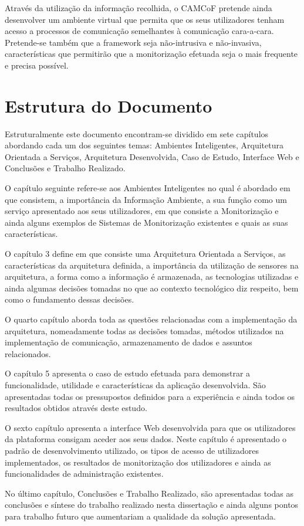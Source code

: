 Através da utilização da informação recolhida, o CAMCoF pretende ainda desenvolver um ambiente virtual que permita que os seus utilizadores tenham acesso a processos de comunicação semelhantes à comunicação cara-a-cara. Pretende-se também que a framework seja não-intrusiva e não-invasiva, características que permitirão que a monitorização efetuada seja o mais frequente e precisa possível.

\section{Estrutura do Documento}

Estruturalmente este documento encontram-se dividido em sete capítulos abordando cada um dos seguintes temas: Ambientes Inteligentes, Arquitetura Orientada a Serviços, Arquitetura Desenvolvida, Caso de Estudo, Interface Web e Conclusões e Trabalho Realizado. 

O capítulo seguinte refere-se aos Ambientes Inteligentes no qual é abordado em que consistem, a importância da Informação Ambiente, a sua função como um serviço apresentado aos seus utilizadores, em que consiste a Monitorização e ainda alguns exemplos de Sistemas de Monitorização existentes e quais as suas características.

O capítulo 3 define em que consiste uma Arquitetura Orientada a Serviços, as características da arquitetura definida, a importância da utilização de sensores na arquitetura, a forma como a informação é armazenada, as tecnologias utilizadas e ainda algumas decisões tomadas no que ao contexto tecnológico diz respeito, bem como o fundamento dessas decisões.

O quarto capítulo aborda toda as questões relacionadas com a implementação da arquitetura, nomeadamente todas as decisões tomadas, métodos utilizados na implementação de comunicação, armazenamento de dados e assuntos relacionados.

O capítulo 5 apresenta o caso de estudo efetuada para demonstrar a funcionalidade, utilidade e características da aplicação desenvolvida. São apresentadas todas os pressupostos definidos para a experiência e ainda todos os resultados obtidos através deste estudo.

O sexto capítulo apresenta a interface Web desenvolvida para que os utilizadores da plataforma consigam aceder aos seus dados. Neste capítulo é apresentado o padrão de desenvolvimento utilizado, os tipos de acesso de utilizadores implementados, os resultados de monitorização dos utilizadores e ainda as funcionalidades de administração existentes.

No último capítulo, Conclusões e Trabalho Realizado, são apresentadas todas as conclusões e síntese do trabalho realizado nesta dissertação e ainda alguns pontos para trabalho futuro que aumentariam a qualidade da solução apresentada.

